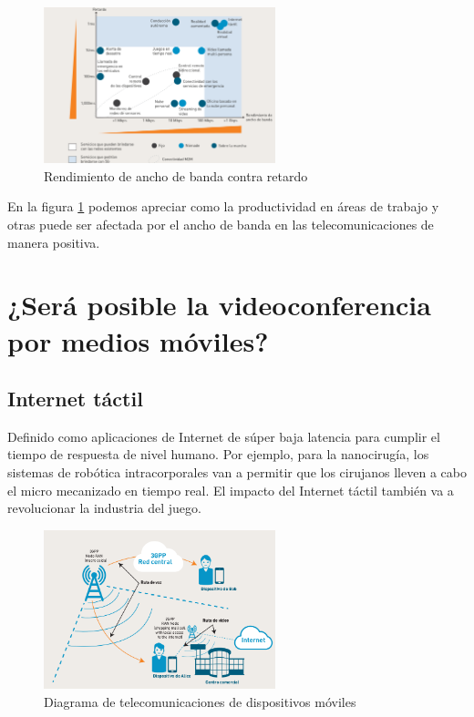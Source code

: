 \documentclass[]{article}
\begin{document}
\begin{figure}[h!]
	\centering
	\includegraphics[width=0.6\textwidth]{Imagenes/sist1.png}
	\caption{Rendimiento de ancho de banda contra retardo}
	\label{fig:sist1}
\end{figure}


En la figura \ref{fig:sist1} podemos apreciar como la productividad en áreas de trabajo y otras puede ser afectada por el ancho de banda en las telecomunicaciones de manera positiva.\\


\section{¿Será posible la videoconferencia por medios móviles?}


\subsection{Internet táctil}

Definido como aplicaciones de
Internet de súper baja latencia
para cumplir el tiempo de
respuesta de nivel humano. Por
ejemplo, para la nanocirugía, los
sistemas de robótica
intracorporales van a permitir que
los cirujanos lleven a cabo el
micro mecanizado en tiempo real.
El impacto del Internet táctil
también va a revolucionar la
industria del juego.\\

\begin{figure}[h!]
	\centering
	\includegraphics[width=0.6\textwidth]{Imagenes/sist2.png}
	\caption{Diagrama de telecomunicaciones de dispositivos móviles}
	\label{fig:sist2}
\end{figure}
\end{document}
